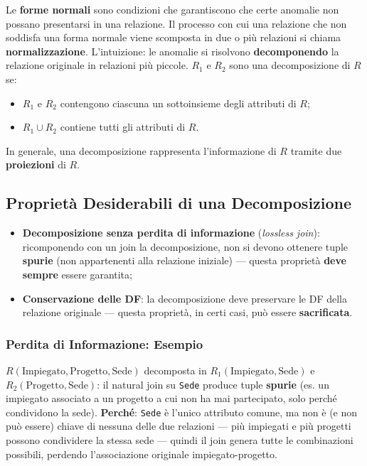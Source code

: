 \documentclass[12pt, a4paper]{article}
\begin{document}
Le \textbf{forme normali} sono condizioni che garantiscono che certe anomalie non possano presentarsi in una relazione. Il processo con cui una relazione che non soddisfa una forma normale viene scomposta in due o più relazioni si chiama \textcolor{tocsec}{\textbf{normalizzazione}}. L'intuizione: le anomalie si risolvono \textbf{decomponendo} la relazione originale in relazioni più piccole. $R_1$ e $R_2$ sono una decomposizione di $R$ se:
\begin{itemize}
    \item $R_1$ e $R_2$ contengono ciascuna un sottoinsieme degli attributi di $R$;
    \item $R_1 \cup R_2$ contiene tutti gli attributi di $R$.
\end{itemize}
In generale, una decomposizione rappresenta l'informazione di $R$ tramite due \textbf{proiezioni} di $R$.

\subsection{Proprietà Desiderabili di una Decomposizione}
\begin{itemize}
    \item \textbf{Decomposizione senza perdita di informazione} (\textit{lossless join}): ricomponendo con un join la decomposizione, non si devono ottenere tuple \textbf{spurie} (non appartenenti alla relazione iniziale) — questa proprietà \textbf{deve sempre} essere garantita;
    \item \textbf{Conservazione delle DF}: la decomposizione deve preservare le DF della relazione originale — questa proprietà, in certi casi, può essere \textbf{sacrificata}.
\end{itemize}

\subsubsection{Perdita di Informazione: Esempio}
$R(\text{Impiegato},\text{Progetto},\text{Sede})$ decomposta in $R_1(\text{Impiegato},\text{Sede})$ e $R_2(\text{Progetto},\text{Sede})$: il natural join su \texttt{Sede} produce tuple \textbf{spurie} (es. un impiegato associato a un progetto a cui non ha mai partecipato, solo perché condividono la sede). \textbf{Perché}: \texttt{Sede} è l'unico attributo comune, ma non è (e non può essere) chiave di nessuna delle due relazioni — più impiegati e più progetti possono condividere la stessa sede — quindi il join genera tutte le combinazioni possibili, perdendo l'associazione originale impiegato-progetto.
\end{document}
